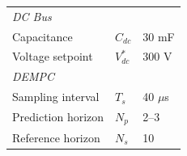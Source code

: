 \documentclass[journal]{IEEEtran}
\begin{document}
\begin{table}[!h]
\begin{tabular}{@{}lll@{}}
\midrule
\multicolumn{3}{l}{\textit{DC Bus}} \\
Capacitance             & $C_{dc}$   & 30 mF \\
Voltage setpoint        & $V_{dc}^*$ & 300 V \\
\midrule
\multicolumn{3}{l}{\textit{DEMPC}} \\
Sampling interval       & $T_s$      & 40 $\mu$s \\
Prediction horizon      & $N_p$      & 2--3 \\
Reference horizon       & $N_s$      & 10 \\
\bottomrule
\end{tabular}
\end{table}



\end{document}

